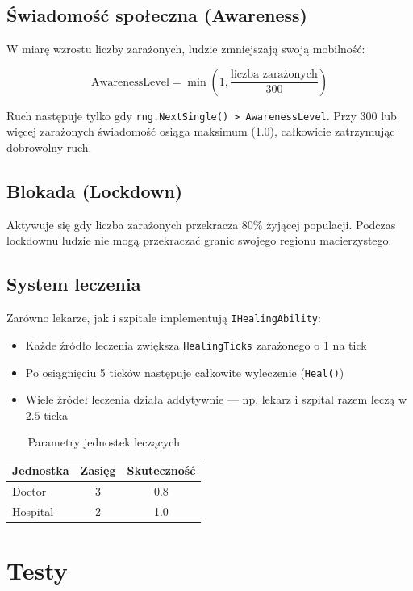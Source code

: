 \documentclass[a4paper,12pt]{article}
\begin{document}
\subsection{Świadomość społeczna (Awareness)}

W miarę wzrostu liczby zarażonych, ludzie zmniejszają swoją mobilność:

\[
\text{AwarenessLevel} = \min\left(1, \frac{\text{liczba zarażonych}}{300}\right)
\]

Ruch następuje tylko gdy \texttt{rng.NextSingle() > AwarenessLevel}. Przy 300 lub więcej
zarażonych świadomość osiąga maksimum (1.0), całkowicie zatrzymując dobrowolny ruch.

\subsection{Blokada (Lockdown)}

Aktywuje się gdy liczba zarażonych przekracza 80\% żyjącej populacji. Podczas lockdownu
ludzie nie mogą przekraczać granic swojego regionu macierzystego.

\subsection{System leczenia}

Zarówno lekarze, jak i szpitale implementują \texttt{IHealingAbility}:

\begin{itemize}
    \item Każde źródło leczenia zwiększa \texttt{HealingTicks} zarażonego o 1 na tick
    \item Po osiągnięciu 5 ticków następuje całkowite wyleczenie (\texttt{Heal()})
    \item Wiele źródeł leczenia działa addytywnie --- np. lekarz i szpital razem
          leczą w $2.5$ ticka
\end{itemize}

\begin{table}[H]
\centering
\begin{tabular}{|l|c|c|}
\hline
\textbf{Jednostka} & \textbf{Zasięg} & \textbf{Skuteczność} \\ \hline
Doctor  & 3 & 0.8 \\
Hospital & 2 & 1.0 \\ \hline
\end{tabular}
\caption{Parametry jednostek leczących}
\end{table}

\section{Testy}
\end{document}
